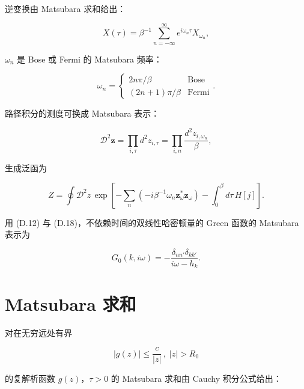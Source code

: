 逆变换由 Matsubara 求和给出：

\begin{equation*}
X ( \tau ) = \beta^ {- 1} \sum_{n = - \infty} ^ {\infty} e ^ {i\omega_{n} \tau} X _ {\omega_ {n}} ,
\tag{D.19}
\end{equation*}

$\omega_{n}$ 是 Bose 或 Fermi 的 Matsubara 频率：

\begin{equation*}
\omega_ {n} = \left\{ \begin{array}{ll} 2 n \pi / \beta & \text{Bose} \\ ( 2n + 1 ) \pi / \beta & \text{Fermi} \end{array} \right..
\tag{D.20}
\end{equation*}

路径积分的测度可换成 Matsubara 表示：

\begin{equation*}
\mathcal {D} ^ {2} \mathbf {z} = \prod_{i, \tau} d ^ {2} z_{i, \tau} = \prod_{i, n} \frac {d ^ {2} z_{i , \omega_ {n}}}{\beta} ,
\tag{D.21}
\end{equation*}

生成泛函为

\begin{equation*}
Z = \oint \mathcal {D} ^ {2} z \, \exp \left[ - \sum_ {n} \left( - i \beta^ {- 1} \omega_ {n} \mathbf {z} _ {\omega} ^ {*} \mathbf {z} _ {\omega} \right) - \int_ {0} ^ {\beta} d \tau \, H [ j ] \right] .
\tag{D.22}
\end{equation*}

用 (D.12) 与 (D.18)，不依赖时间的双线性哈密顿量的 Green 函数的 Matsubara 表示为

\begin{equation*}
G _ {0} ( k, i\omega ) = - \frac {\delta_{nn'} \delta_{kk'}}{i\omega - h_{k}}.
\tag{D.23}
\end{equation*}

\section{Matsubara 求和}

对在无穷远处有界

\begin{equation*}
\left| g ( z ) \right| \leq \frac {c}{| z |} \, , \; | z | > R _ {0}
\tag{D.24}
\end{equation*}

的复解析函数 $g(z)$，$\tau > 0$ 的 Matsubara 求和由 Cauchy 积分公式给出：


